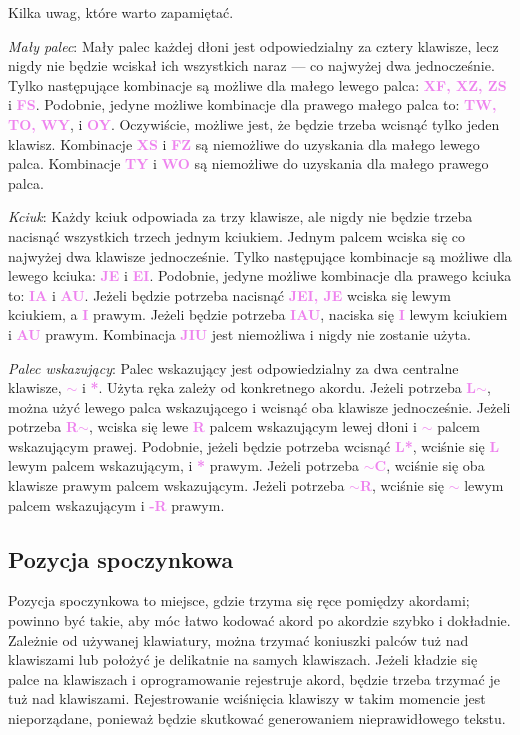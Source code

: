 \documentclass[12p, oneside]{book}
\newcommand{\steno}[1]{\textbf{\textsf{\textcolor{violet}{ #1}}}}
\begin{document}
Kilka uwag, które warto zapamiętać.

\emph{Mały palec}: Mały palec każdej dłoni jest odpowiedzialny za cztery klawisze, lecz nigdy nie będzie wciskał ich wszystkich naraz --- co najwyżej dwa jednocześnie. Tylko następujące kombinacje są możliwe dla małego lewego palca: \steno{XF, XZ, ZS} i \steno{FS}. Podobnie, jedyne możliwe kombinacje dla prawego małego palca to: \steno{TW, TO, WY}, i \steno{OY}. Oczywiście, możliwe jest, że będzie trzeba wcisnąć tylko jeden klawisz. Kombinacje \steno{XS} i \steno{FZ} są niemożliwe do uzyskania dla małego lewego palca. Kombinacje \steno{TY} i \steno{WO} są niemożliwe do uzyskania dla małego prawego palca.

\emph{Kciuk}: Każdy kciuk odpowiada za trzy klawisze, ale nigdy nie będzie trzeba nacisnąć wszystkich trzech jednym kciukiem. Jednym palcem wciska się co najwyżej dwa klawisze jednocześnie. Tylko następujące kombinacje są możliwe dla lewego kciuka: \steno{JE} i \steno{EI}. Podobnie, jedyne możliwe kombinacje dla prawego kciuka to: \steno{IA} i \steno{AU}. Jeżeli będzie potrzeba nacisnąć \steno{JEI, JE} wciska się lewym kciukiem, a \steno{I} prawym. Jeżeli będzie potrzeba \steno{IAU}, naciska się \steno{I} lewym kciukiem i \steno{AU} prawym. Kombinacja \steno{JIU} jest niemożliwa i nigdy nie zostanie użyta.

\emph{Palec wskazujący}: Palec wskazujący jest odpowiedzialny za dwa centralne klawisze, \steno{$\sim$} i \steno{*}. Użyta ręka zależy od konkretnego akordu. Jeżeli potrzeba \steno{L$\sim$}, można użyć lewego palca wskazującego i wcisnąć oba klawisze jednocześnie. Jeżeli potrzeba \steno{R$\sim$}, wciska się lewe \steno{R} palcem wskazującym lewej dłoni i \steno{$\sim$} palcem wskazującym prawej. Podobnie, jeżeli będzie potrzeba wcisnąć \steno{L*}, wciśnie się \steno{L} lewym palcem wskazującym, i \steno{*} prawym. Jeżeli potrzeba \steno{$\sim$C}, wciśnie się oba klawisze prawym palcem wskazującym. Jeżeli potrzeba \steno{$\sim$R}, wciśnie się \steno{$\sim$} lewym palcem wskazującym i \steno{-R} prawym.

\subsection{Pozycja spoczynkowa}
Pozycja spoczynkowa to miejsce, gdzie trzyma się ręce pomiędzy akordami; powinno być takie, aby móc łatwo kodować akord po akordzie szybko i dokładnie. Zależnie od używanej klawiatury, można trzymać koniuszki palców tuż nad klawiszami lub położyć je delikatnie na samych klawiszach. Jeżeli kładzie się palce na klawiszach i oprogramowanie rejestruje akord, będzie trzeba trzymać je tuż nad klawiszami. Rejestrowanie wciśnięcia klawiszy w takim momencie jest nieporządane, ponieważ będzie skutkować generowaniem nieprawidłowego tekstu.
\end{document}
